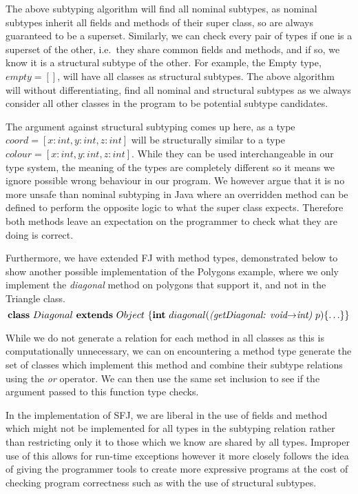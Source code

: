 \documentclass[runningheads]{llncs}
\begin{document}
The above subtyping algorithm will find all nominal subtypes, as nominal subtypes inherit all fields and methods of their super class, so are always guaranteed to be a superset. 
Similarly, we can check every pair of types if one is a superset of the other, i.e.\ they share common fields and methods, and if so, we know it is a structural subtype of the other. 
For example, the Empty type, $empty = []$, will have all classes as structural subtypes. 
The above algorithm will without differentiating, find all nominal and structural subtypes as we always consider all other classes in the program to be potential subtype candidates.

The argument against structural subtyping comes up here, as a type $coord = [x:int, y:int, z:int]$ will be structurally similar to a type $colour = [x:int, y:int, z:int]$. 
While they can be used interchangeable in our type system, the meaning of the types are completely different so it means we ignore possible wrong behaviour in our program. 
We however argue that it is no more unsafe than nominal subtyping in Java where an overridden method can be defined to perform the opposite logic to what the super class expects. 
Therefore both methods leave an expectation on the programmer to check what they are doing is correct. 

Furthermore, we have extended FJ with method types, demonstrated below to show another possible implementation of the Polygons example, where we only implement the \textit{diagonal} method on polygons that support it, and not in the Triangle class. 
$$
\mathbf{class} \  Diagonal \ \mathbf{extends }\  Object\ \{
	\mathbf{int}\ diagonal(\textit{(getDiagonal: void$\rightarrow$int)}  \ p)\{\ldots\}
\}
$$

While we do not generate a relation for each method in all classes as this is computationally unnecessary, we can on encountering a method type generate the set of classes which implement this method and combine their subtype relations using the \textit{or} operator. 
We can then use the same set inclusion to see if the argument passed to this function type checks. 

In the implementation of SFJ, we are liberal in the use of fields and method which might not be implemented for all types in the subtyping relation rather than restricting only it to those which we know are shared by all types.
Improper use of this allows for run-time exceptions however it more closely follows the idea of giving the programmer tools to create more expressive programs at the cost of checking program correctness such as with the use of structural subtypes. 
\end{document}
